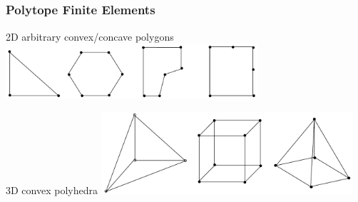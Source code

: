 \documentclass[compress,10pt]{beamer}
\begin{document}
\subsection{}
\begin{frame}[t]\frametitle{Polytope Finite Elements}
\centering
\begin{block}{2D arbitrary convex/concave polygons}
\centering
\includegraphics[width=0.70\textwidth]{images/arbitrary_polygons.png}
\end{block}
\vspace{0.5cm}
\begin{block}{3D convex polyhedra}
\centering
\includegraphics[width=0.70\textwidth]{images/arbitrary_polyhedra.png}
\end{block}
\end{frame}
\end{document}
